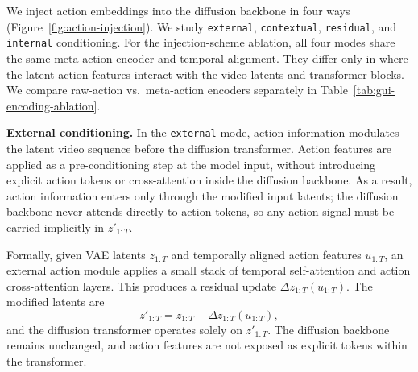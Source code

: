 We inject action embeddings into the diffusion backbone in four ways (Figure~\ref{fig:action-injection}).
We study \texttt{external}, \texttt{contextual}, \texttt{residual}, and \texttt{internal} conditioning.
For the injection-scheme ablation, all four modes share the same meta-action encoder and temporal alignment.
They differ only in where the latent action features interact with the video latents and transformer blocks.
We compare raw-action vs.\ meta-action encoders separately in Table~\ref{tab:gui-encoding-ablation}.

\noindent\textbf{External conditioning.}
In the \texttt{external} mode, action information modulates the latent video sequence before the diffusion transformer.
Action features are applied as a pre-conditioning step at the model input, without introducing explicit action tokens or cross-attention inside the diffusion backbone.
As a result, action information enters only through the modified input latents; the diffusion backbone never attends directly to action tokens, so any action signal must be carried implicitly in $z'_{1:T}$.

Formally, given VAE latents $z_{1:T}$ and temporally aligned action features $u_{1:T}$, an external action module applies a small stack of temporal self-attention and action cross-attention layers.
This produces a residual update $\Delta z_{1:T}(u_{1:T})$.
The modified latents are
\[
  z'_{1:T} = z_{1:T} + \Delta z_{1:T}(u_{1:T}),
\]
and the diffusion transformer operates solely on $z'_{1:T}$.
The diffusion backbone remains unchanged, and action features are not exposed as explicit tokens within the transformer.

